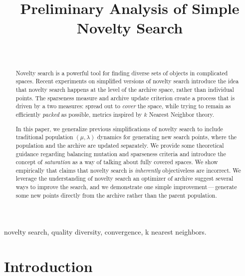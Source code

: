 \documentclass[twoside]{article}
\begin{document}
\title{\bf Preliminary Analysis of Simple Novelty Search}  

\author{ \hfill {}\\ 
}

\maketitle

\begin{abstract}
Novelty search is a powerful tool for finding diverse sets of objects in complicated spaces.  Recent experiments on simplified versions of novelty search introduce the idea that novelty search happens at the level of the archive space, rather than individual points.  The sparseness measure and archive update criterion create a process that is driven by a two measures:  spread out to \emph{cover} the space, while trying to remain as efficiently \emph{packed} as possible, metrics inspired by $k$ Nearest Neighbor theory.  

In this paper, we generalize previous simplifications of novelty search to include traditional population  $(\mu, \lambda)$ dynamics for generating new search points, where the population and the archive are updated separately.  We provide some theoretical guidance regarding balancing mutation and sparseness criteria and introduce the concept of \emph{saturation} as a way of talking about fully covered spaces.  We show empirically that claims that novelty search is \emph{inherently} objectiveless are incorrect.  We leverage the understanding of novelty search an optimizer of archive  suggest several ways to improve the search, and we demonstrate one simple improvement\,---\,generate some new points directly from the archive rather than the parent population.
\end{abstract}

\begin{keywords}
novelty search, 
quality diversity,
convergence,
k nearest neighbors.
\end{keywords}

\section{Introduction}
\label{sec:introduction}
\end{document}
